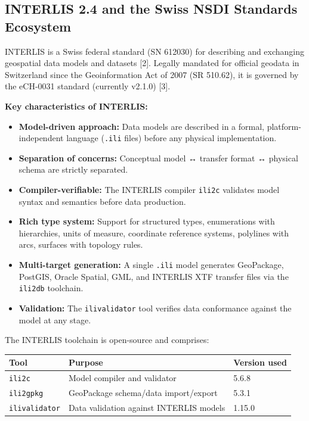 \documentclass[conference]{IEEEtran}
\begin{document}
\subsection{INTERLIS 2.4 and the Swiss NSDI Standards Ecosystem}

INTERLIS is a Swiss federal standard (SN 612030) for describing and exchanging geospatial data models and datasets [2]. Legally mandated for official geodata in Switzerland since the Geoinformation Act of 2007 (SR 510.62), it is governed by the eCH-0031 standard (currently v2.1.0) [3].

\textbf{Key characteristics of INTERLIS:}

\begin{itemize}[leftmargin=*]
\item \textbf{Model-driven approach:} Data models are described in a formal, platform-independent language (\texttt{.ili} files) before any physical implementation.
\item \textbf{Separation of concerns:} Conceptual model ↔ transfer format ↔ physical schema are strictly separated.
\item \textbf{Compiler-verifiable:} The INTERLIS compiler \texttt{ili2c} validates model syntax and semantics before data production.
\item \textbf{Rich type system:} Support for structured types, enumerations with hierarchies, units of measure, coordinate reference systems, polylines with arcs, surfaces with topology rules.
\item \textbf{Multi-target generation:} A single \texttt{.ili} model generates GeoPackage, PostGIS, Oracle Spatial, GML, and INTERLIS XTF transfer files via the \texttt{ili2db} toolchain.
\item \textbf{Validation:} The \texttt{ilivalidator} tool verifies data conformance against the model at any stage.
\end{itemize}

The INTERLIS toolchain is open-source and comprises:

\begin{center}
\begin{longtable}{p{}p{}p{}}
Tool & Purpose & Version used \\
\midrule
\texttt{ili2c} & Model compiler and validator & 5.6.8 \\
\texttt{ili2gpkg} & GeoPackage schema/data import/export & 5.3.1 \\
\texttt{ilivalidator} & Data validation against INTERLIS models & 1.15.0 \\
\end{longtable}
\end{center}
\end{document}
